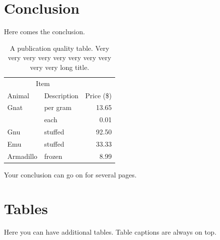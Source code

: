 \documentclass[msc,oneside]{ubcthesis}%
\begin{document}
\chapter{Conclusion}
Here comes the conclusion.
\begin{table}[tbph]
\centering
\caption{A publication quality table. Very very very very very very very very very very long title.
\label{table:food1}}
\begin{tabular}{@{}llr@{}} \toprule 
\multicolumn{2}{c}{Item} \\ \cmidrule(r){1-2} 
Animal & Description & Price (\$)\\ \midrule 
Gnat & per gram & 13.65 \\ 
& each & 0.01 \\ 
Gnu & stuffed & 92.50 \\ 
Emu & stuffed & 33.33 \\ 
Armadillo & frozen & 8.99 \\ \bottomrule 
\end{tabular}
\end{table}

\newpage
Your conclusion can go on for several pages.


%


\newpage %
\pagestyle{fancy}\rhead{}\cfoot{}\rfoot{\thepage}


%

\newpage
\pagestyle{headings}




\chapter{Tables}
Here you can have additional tables. Table captions are always on top.
\end{document}
